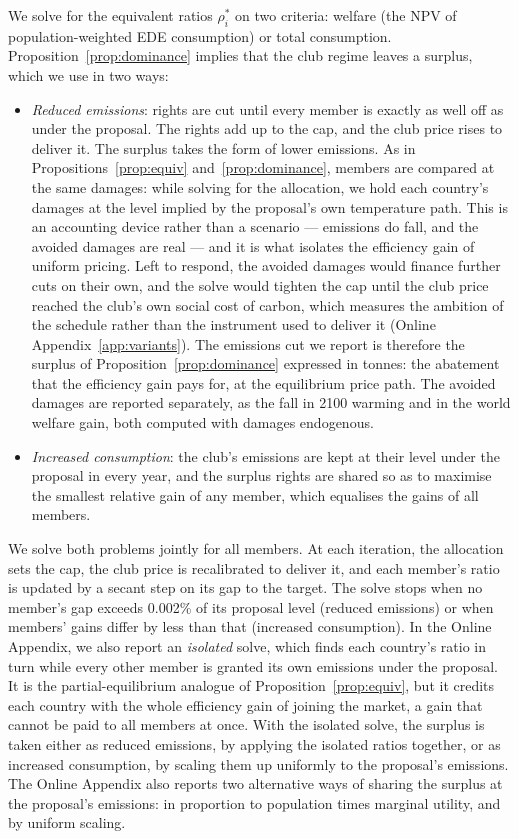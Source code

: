 \documentclass[12pt,english]{article}
\theoremstyle{remark}
\begin{document}
We solve for the equivalent ratios $\rho^*_i$ on two criteria: welfare (the NPV of population-weighted EDE consumption) or total consumption. Proposition~\ref{prop:dominance} implies that the club regime leaves a surplus, which we use in two ways:
\begin{itemize}
  \item \emph{Reduced emissions}: rights are cut until every member is exactly as well off as under the proposal. The rights add up to the cap, and the club price rises to deliver it. The surplus takes the form of lower emissions. As in Propositions~\ref{prop:equiv} and~\ref{prop:dominance}, members are compared at the same damages: while solving for the allocation, we hold each country's damages at the level implied by the proposal's own temperature path. This is an accounting device rather than a scenario --- emissions do fall, and the avoided damages are real --- and it is what isolates the efficiency gain of uniform pricing. Left to respond, the avoided damages would finance further cuts on their own, and the solve would tighten the cap until the club price reached the club's own social cost of carbon, which measures the ambition of the schedule rather than the instrument used to deliver it (Online Appendix~\ref{app:variants}). The emissions cut we report is therefore the surplus of Proposition~\ref{prop:dominance} expressed in tonnes: the abatement that the efficiency gain pays for, at the equilibrium price path. The avoided damages are reported separately, as the fall in 2100 warming and in the world welfare gain, both computed with damages endogenous.
  \item \emph{Increased consumption}: the club's emissions are kept at their level under the proposal in every year, and the surplus rights are shared so as to maximise the smallest relative gain of any member, which equalises the gains of all members.
\end{itemize}
We solve both problems jointly for all members. At each iteration, the allocation sets the cap, the club price is recalibrated to deliver it, and each member's ratio is updated by a secant step on its gap to the target. The solve stops when no member's gap exceeds 0.002\% of its proposal level (reduced emissions) or when members' gains differ by less than that (increased consumption). In the Online Appendix, we also report an \emph{isolated} solve, which finds each country's ratio in turn while every other member is granted its own emissions under the proposal. It is the partial-equilibrium analogue of Proposition~\ref{prop:equiv}, but it credits each country with the whole efficiency gain of joining the market, a gain that cannot be paid to all members at once. With the isolated solve, the surplus is taken either as reduced emissions, by applying the isolated ratios together, or as increased consumption, by scaling them up uniformly to the proposal's emissions. The Online Appendix also reports two alternative ways of sharing the surplus at the proposal's emissions: in proportion to population times marginal utility, and by uniform scaling.
\end{document}
